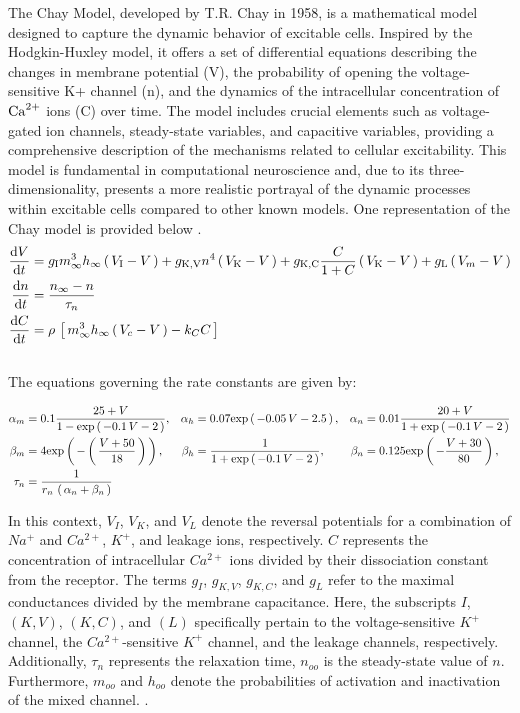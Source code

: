 \documentclass[../Orator]{subfiles}
\begin{document}
The Chay Model, developed by T.R. Chay in 1958, is a mathematical model designed to capture the dynamic behavior of excitable cells. Inspired by the Hodgkin-Huxley model, it offers a set of differential equations describing the changes in membrane potential (V), the probability of opening the voltage-sensitive K+ channel (n), and the dynamics of the intracellular concentration of \(\mathrm{Ca}^{2+}\) ions (C) over time. The model includes crucial elements such as voltage-gated ion channels, steady-state variables, and capacitive variables, providing a comprehensive description of the mechanisms related to cellular excitability. This model is fundamental in computational neuroscience and, due to its three-dimensionality, presents a more realistic portrayal of the dynamic processes within excitable cells compared to other known models. One representation of the Chay model is provided below \cite{}. \\
\begin{align}
    \frac{\mathrm{d}\displaystyle V}{\mathrm{d}\displaystyle t} &= g_\mathrm{I}  m^3_\infty h_\infty \left(\,V_\mathrm{I} - V\,\right) + g_\mathrm{K, V} n^4 \left(\,V_\mathrm{K} - V\,\right) + g_\mathrm{K, C}  \frac{C}{1+C}\left(\,V_\mathrm{K} - V\,\right) + g_\mathrm{L} \left(\,V_m - V\,\right) \\
    \frac{\mathrm{d}\displaystyle n}{\mathrm{d}\displaystyle t} &= \frac{n_\infty - n}{\tau_n} \\
    \frac{\mathrm{d}\displaystyle C}{\mathrm{d}\displaystyle t} &= \rho \, \left[\,m^3_\infty h_\infty \left(\,V_c - V\,\right) - k_C C\,\right]
\end{align}\\
The equations governing the rate constants are given by:

\begin{align*}
    \alpha_m &= 0.1 \frac{25 + V}{1 - \mathrm{exp}\left(\,-0.1 \, V - 2\,\right)}, &
    \alpha_h &=  0.07 \mathrm{exp}\left(\,-0.05\,V -2.5\,\right), &
    \alpha_n &= 0.01 \frac{20 + V}{1 + \mathrm{exp}\left(\,-0.1 \, V - 2\,\right)} \\
    \beta_m  &= 4 \mathrm{exp}\left(\,-\left(\,\frac{ V + 50 }{ 18 } \,\right) \,\right), &
    \beta_h  &= \frac{ 1 }{ 1 + \mathrm{exp}\left(\,-0.1 \, V - 2\,\right)}, &
    \beta_n  &= 0.125 \mathrm{exp}\left(\,- \frac{V + 30}{80}\,\right), \\
    \tau_n &= \frac{1}{ r_n \, \left(\,\alpha_n + \beta_n\,\right) }
\end{align*} 

In this context, $V_I$, $V_K$, and $V_L$ denote the reversal potentials for a combination of $Na^+$ and $Ca^{2+}$, $K^+$, and leakage ions, respectively. $C$ represents the concentration of intracellular $Ca^{2+}$ ions divided by their dissociation constant from the receptor. The terms $g_I$, $g_{K,V}$, $g_{K,C}$, and $g_L$ refer to the maximal conductances divided by the membrane capacitance. Here, the subscripts $I$, $(K,V)$, $(K,C)$, and $(L)$ specifically pertain to the voltage-sensitive $K^+$ channel, the $Ca^{2+}$-sensitive $K^+$ channel, and the leakage channels, respectively. Additionally, $\tau_n$ represents the relaxation time, $n_{oo}$ is the steady-state value of $n$. Furthermore, $m_{oo}$ and $h_{oo}$ denote the probabilities of activation and inactivation of the mixed channel. \cite{}.
\end{document}
